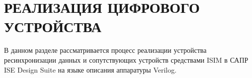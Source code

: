 \chapter{РЕАЛИЗАЦИЯ ЦИФРОВОГО УСТРОЙСТВА}

В данном разделе рассматривается процесс реализации устройства ресинхронизации данных и сопутствующих устройств средствами ISIM в САПР ISE Design Suite на языке описания аппаратуры Verilog.






